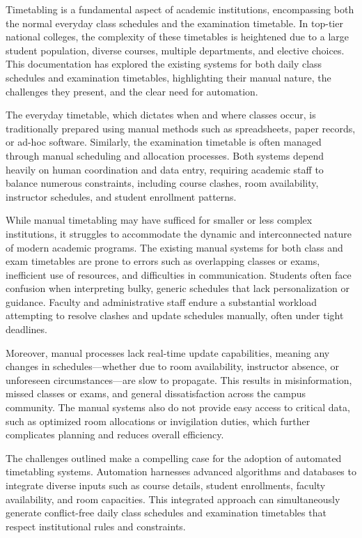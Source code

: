 \documentclass[a4paper,12pt]{article}
\begin{document}
Timetabling is a fundamental aspect of academic institutions, encompassing both the normal everyday class schedules and the examination timetable. In top-tier national colleges, the complexity of these timetables is heightened due to a large student population, diverse courses, multiple departments, and elective choices. This documentation has explored the existing systems for both daily class schedules and examination timetables, highlighting their manual nature, the challenges they present, and the clear need for automation.\newline

The everyday timetable, which dictates when and where classes occur, is traditionally prepared using manual methods such as spreadsheets, paper records, or ad-hoc software. Similarly, the examination timetable is often managed through manual scheduling and allocation processes. Both systems depend heavily on human coordination and data entry, requiring academic staff to balance numerous constraints, including course clashes, room availability, instructor schedules, and student enrollment patterns.\newline

While manual timetabling may have sufficed for smaller or less complex institutions, it struggles to accommodate the dynamic and interconnected nature of modern academic programs. The existing manual systems for both class and exam timetables are prone to errors such as overlapping classes or exams, inefficient use of resources, and difficulties in communication. Students often face confusion when interpreting bulky, generic schedules that lack personalization or guidance. Faculty and administrative staff endure a substantial workload attempting to resolve clashes and update schedules manually, often under tight deadlines.\newline

Moreover, manual processes lack real-time update capabilities, meaning any changes in schedules—whether due to room availability, instructor absence, or unforeseen circumstances—are slow to propagate. This results in misinformation, missed classes or exams, and general dissatisfaction across the campus community. The manual systems also do not provide easy access to critical data, such as optimized room allocations or invigilation duties, which further complicates planning and reduces overall efficiency.\newline

The challenges outlined make a compelling case for the adoption of automated timetabling systems. Automation harnesses advanced algorithms and databases to integrate diverse inputs such as course details, student enrollments, faculty availability, and room capacities. This integrated approach can simultaneously generate conflict-free daily class schedules and examination timetables that respect institutional rules and constraints.\newline
\end{document}
